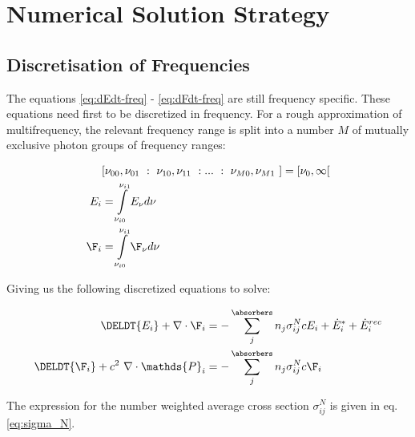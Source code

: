 \section{Numerical Solution Strategy}









\subsection{Discretisation of Frequencies}


The equations \ref{eq:dEdt-freq} - \ref{eq:dFdt-freq} are still frequency specific.
These equations need first to be discretized in frequency. For a rough approximation of 
multifrequency, the relevant frequency range is split into a number $M$ of mutually 
exclusive photon groups of frequency ranges:

\begin{align}
	& [\nu_{00}, \nu_{01}\ : \ \nu_{10}, \nu_{11}\ : ... \ : \ \nu_{M0}, \nu_{M1}\ ] = 
        [\nu_{0}, \infty [ \\
	E_i &= 
        \int\limits_{\nu_{i0}}^{\nu_{i1}} E_\nu d\nu \\
	\F_i &=   
       \int\limits_{\nu_{i0}}^{\nu_{i1}} \F_\nu d\nu
\end{align}


Giving us the following discretized equations to solve:


\begin{align}
	\DELDT{E_i} + \nabla \cdot \F_i &=
		- \sum\limits_{j}^{\absorbers} n_j \sigma_{i j}^N c E_i + \dot{E}_i^* + \dot{E}_i ^{rec}
		\label{eq:dEdt-group} \\
	\DELDT{\F_i} + c^2 \ \nabla \cdot \mathds{P}_i &=
		- \sum\limits_{j}^{\absorbers} n_j \sigma_{i j}^N c \F_i
		\label{eq:dFdt-group}
\end{align}


The expression for the number weighted average cross section $\sigma_{ij}^N$ is given in eq. 
\ref{eq:sigma_N}.

